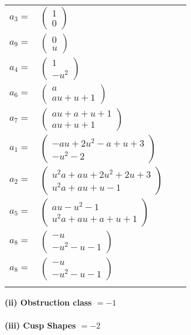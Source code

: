 \documentclass[1p]{elsarticle_modified}
\theoremstyle{definition}
\begin{document}
\begin{tabular}{m{7pt} m{180pt} m{7pt} m{180pt} }
\flushright $a_{3}=$&$\begin{pmatrix}1\\0\end{pmatrix}$ \\
\flushright $a_{9}=$&$\begin{pmatrix}0\\u\end{pmatrix}$ \\
\flushright $a_{4}=$&$\begin{pmatrix}1\\- u^2\end{pmatrix}$ \\
\flushright $a_{6}=$&$\begin{pmatrix}a\\a u+u+1\end{pmatrix}$ \\
\flushright $a_{7}=$&$\begin{pmatrix}a u+a+u+1\\a u+u+1\end{pmatrix}$ \\
\flushright $a_{1}=$&$\begin{pmatrix}- a u+2 u^2- a+u+3\\- u^2-2\end{pmatrix}$ \\
\flushright $a_{2}=$&$\begin{pmatrix}u^2 a+a u+2 u^2+2 u+3\\u^2 a+a u+u-1\end{pmatrix}$ \\
\flushright $a_{5}=$&$\begin{pmatrix}a u- u^2-1\\u^2 a+a u+a+u+1\end{pmatrix}$ \\
\flushright $a_{8}=$&$\begin{pmatrix}- u\\- u^2- u-1\end{pmatrix}$\\ \flushright $a_{8}=$&$\begin{pmatrix}- u\\- u^2- u-1\end{pmatrix}$\\&\end{tabular}
\flushleft \textbf{(ii) Obstruction class $= -1$}\\~\\
\flushleft \textbf{(iii) Cusp Shapes $= -2$}\\~\\
\end{document}
